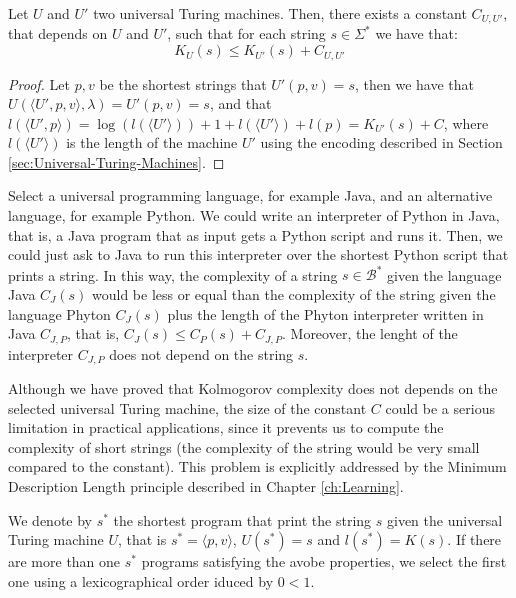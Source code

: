 \begin{theorem}
\label{def:Invariance-theorem}
Let $U$ and $U'$ two universal Turing machines. Then, there exists a constant $C_{U, U'}$, that depends on $U$ and $U'$, such that for each string $s \in \Sigma^{\ast}$ we have that:
\[
K_{U}(s) \leq K_{U'}(s) + C_{U, U'}
\]
\end{theorem}
\begin{proof}
Let $p, v$ be the shortest strings that $U'(p,v)=s$, then we have that $U(\langle U',p, v \rangle, \lambda) = U'(p, v) = s$, and that $l(\langle U',p \rangle) = \log(l(\langle U' \rangle)) + 1 + l(\langle U' \rangle) + l(p) = K_{U'}(s) + C$, where $l(\langle U' \rangle)$ is the length of the machine $U'$ using the encoding described in Section \ref{sec:Universal-Turing-Machines}.
\end{proof}

\begin{example}
Select a universal programming language, for example Java, and an alternative language, for example Python. We could write an interpreter of Python in Java, that is, a Java program that as input gets a Python script and runs it. Then, we could just ask to Java to run this interpreter over the shortest Python script that prints a string. In this way, the complexity of a string $s \in \mathcal{B}^\ast$ given the language Java $C_J(s)$ would be less or equal than the complexity of the string given the language Phyton $C_J(s)$ plus the length of the Phyton interpreter written in Java $C_{J,P}$, that is, $C_J(s) \leq C_P(s) + C_{J,P}$.  Moreover, the lenght of the interpreter $C_{J,P}$ does not depend on the string $s$.
\end{example}

Although we have proved that Kolmogorov complexity does not depends on the selected universal Turing machine, the size of the constant $C$ could be a serious limitation in practical applications, since it prevents us to compute the complexity of short strings (the complexity of the string would be very small compared to the constant). This problem is explicitly addressed by the Minimum Description Length principle described in Chapter \ref{ch:Learning}.

\begin{notation}
We denote by $s^{\ast}$ the shortest program that print the string $s$ given the universal Turing machine $U$, that is $s^\ast = \langle p,v \rangle$, $U(s^\ast) = s$ and $l(s^\ast) = K(s)$. If there are more than one $s^\ast$ programs satisfying the avobe properties, we select the first one using a lexicographical order iduced by $0 < 1$.
\end{notation}

